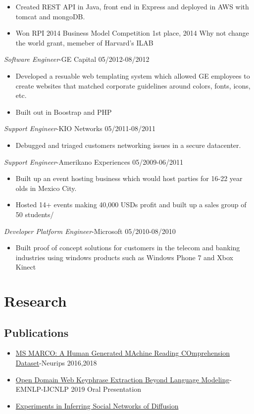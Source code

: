 \documentclass[line,margin]{res}
\begin{document}
\begin{resume}
\begin{itemize}
\item Created REST API in Java, front end in Express and deployed in AWS with tomcat and mongoDB.
\item Won RPI 2014 Business Model Competition 1st place, 2014 Why not change the world grant, memeber of Harvard's ILAB
\end{itemize}
{\sl Software Engineer}-GE Capital \hfill 05/2012-08/2012
\begin{itemize}  \itemsep -4pt
\item Developed a resuable web templating system which allowed GE employees to create websites that matched corporate guidelines around colors, fonts, icons, etc.
\item Built out in Boostrap and PHP
\end{itemize}
{\sl Support Engineer}-KIO Networks \hfill 05/2011-08/2011
\begin{itemize}  \itemsep -4pt
\item Debugged and triaged customers networking issues in a secure datacenter.
\end{itemize}
{\sl Support Engineer}-Amerikano Experiences \hfill 05/2009-06/2011
\begin{itemize}  \itemsep -4pt
\item Built up an event hosting business which would host parties for 16-22 year olds in Mexico City.
\item Hosted 14+ events making 40,000 USDs profit and built up a sales group of 50 students/
\end{itemize}
{\sl Developer Platform Engineer}-Microsoft \hfill 05/2010-08/2010
\begin{itemize}  \itemsep -4pt
\item Built proof of concept solutions for customers in the telecom and banking industries using windows products such as Windows Phone 7 and Xbox Kinect
\end{itemize}
\section{Research}
\subsection{Publications}
\begin{itemize}
\itemsep -5pt
\item \href{https://arxiv.org/pdf/1611.09268.pdf}{MS MARCO: A Human Generated MAchine Reading COmprehension Dataset}-Neurips 2016,2018
\item \href{https://www.emnlp-ijcnlp2019.org/program/accepted/f}{Open Domain Web Keyphrase Extraction Beyond Language Modeling}-EMNLP-IJCNLP 2019 Oral Presentation
\item \href{https://arxiv.org/pdf/}{Experiments in Inferring Social Networks of Diffusion}
\end{itemize}

\end{resume}
\end{document}
